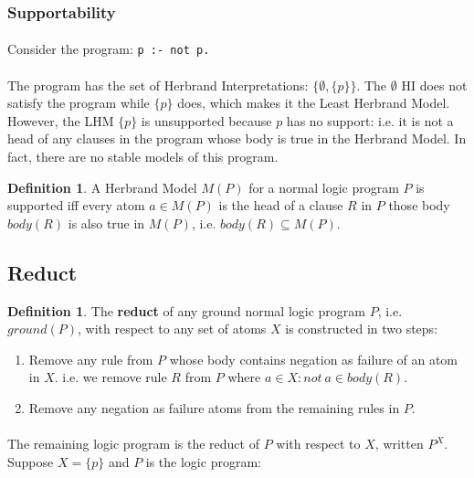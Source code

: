\documentclass{article}
\theoremstyle{plain}
\theoremstyle{definition}
\newtheorem{defn}[thm]{Definition} %
\begin{document}
\begin{multicols}{2}
\subsubsection{Supportability}

\paragraph{} Consider the program: \lstinline{p :- not p.}

\paragraph{} The program has the set of Herbrand Interpretations: $\{\emptyset, \{p\}\}$. The $\emptyset$ HI does not satisfy the program while $\{p\}$ does, which makes it the Least Herbrand Model. However, the LHM $\{p\}$ is unsupported because $p$ has no support: i.e. it is not a head of any clauses in the program whose body is true in the Herbrand Model. In fact, there are no stable models of this program.

\begin{defn}A Herbrand Model $M(P)$ for a normal logic program $P$ is supported iff every atom $a \in M(P)$ is the head of a clause $R$ in $P$ those body $body(R)$ is also true in $M(P)$, i.e. $body(R) \subseteq M(P)$. \end{defn}

\subsection{Reduct}

\begin{defn}The \textbf{reduct} of any ground normal logic program $P$, i.e. $ground(P)$, with respect to any set of atoms $X$ is constructed in two steps:\end{defn}

\begin{enumerate}
\item Remove any rule from $P$ whose body contains negation as failure of an atom in $X$. i.e. we remove rule $R$ from $P$ where $a \in X: not\ a \in body(R)$.
\item Remove any negation as failure atoms from the remaining rules in $P$.
\end{enumerate}

\paragraph{} The remaining logic program is the reduct of $P$ with respect to $X$, written $P^X$. Suppose $X = \{p\}$ and $P$ is the logic program:


\end{multicols}
\end{document}
